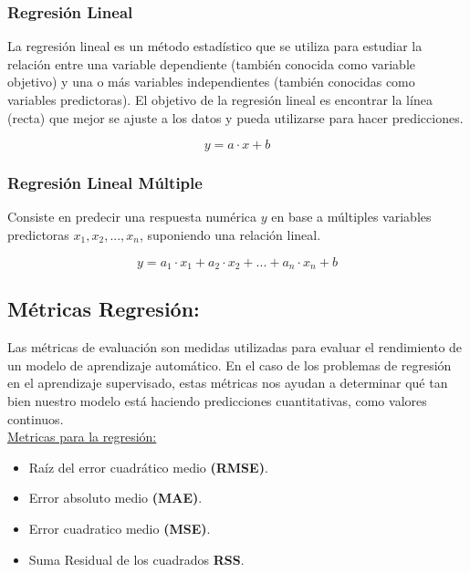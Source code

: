 \documentclass[../main.tex]{subfiles}
\begin{document}
        \subsubsection{Regresión Lineal}
            La regresión lineal es un método estadístico que se utiliza para estudiar la relación entre una variable dependiente (también conocida como variable objetivo) y una o más variables independientes (también conocidas como variables predictoras). El objetivo de la regresión lineal es encontrar la línea (recta) que mejor se ajuste a los datos y pueda utilizarse para hacer predicciones.
        
           \begin{equation}
                y = a \cdot x + b
           \end{equation}
            
        \subsubsection{Regresión Lineal Múltiple}
            Consiste en predecir una respuesta numérica $y$ en base a múltiples variables predictoras $x_1, x_2, ..., x_n $, suponiendo una relación lineal. 
		
		\begin{equation}
			y = a_1 \cdot x_1 + a_2 \cdot x_2 + ... + a_n \cdot x_n + b
		\end{equation}
		
	\subsection{Métricas Regresión:}
        Las métricas de evaluación son medidas utilizadas para evaluar el rendimiento de un modelo de aprendizaje automático. En el caso de los problemas de regresión en el aprendizaje supervisado, estas métricas nos ayudan a determinar qué tan bien nuestro modelo está haciendo predicciones cuantitativas, como valores continuos.\\
    
        \underline{Metricas para la regresión:}
        \begin{itemize}
            \item Raíz del error cuadrático medio \textbf{(RMSE)}.
            \item Error absoluto medio \textbf{(MAE)}.
            \item Error cuadratico medio \textbf{(MSE)}.
            \item Suma Residual de los cuadrados \textbf{RSS}.
        \end{itemize}
    
\end{document}
